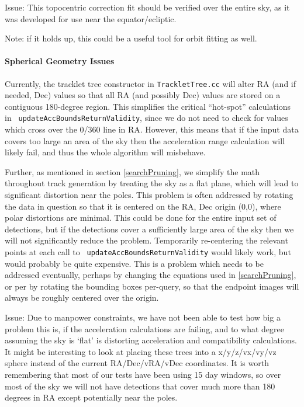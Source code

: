 Issue: This topocentric correction fit should be verified over the entire sky, as it was developed for
use near the equator/ecliptic. 

Note: if it holds up, this could be a useful tool for orbit fitting as well. 


\paragraph{Spherical Geometry Issues}
Currently, the tracklet tree constructor in {\tt TrackletTree.cc} will
alter RA (and if needed, Dec) values so that all RA (and possibly Dec)
values are stored on a contiguous 180-degree region.  This simplifies
the critical ``hot-spot'' calculations in {\tt
  updateAccBoundsReturnValidity}, since we do not need to check for
values which cross over the 0/360 line in RA.  However, this means
that if the input data covers too large an area of the sky then the
acceleration range calculation will likely fail, and thus the whole
algorithm will misbehave.

Further, as mentioned in section \ref{searchPruning}, we simplify the
math throughout track generation by treating the sky as a flat plane,
which will lead to significant distortion near the poles.  This
problem is often addressed by rotating the data in question so that it
is centered on the RA, Dec origin (0,0), where polar distortions are
minimal.  This could be done for the entire input set of detections,
but if the detections cover a sufficiently large area of the sky then
we will not significantly reduce the problem.  Temporarily
re-centering the relevant points at each call to {\tt
  updateAccBoundsReturnValidity} would likely work, but would probably
be quite expensive.  This is a problem which needs to be addressed
eventually, perhaps by changing the equations used in
\ref{searchPruning}, or per by rotating the bounding boxes per-query,
so that the endpoint images will always be roughly centered over the
origin.

Issue: Due to manpower constraints, we have not been able to test how big a problem this is, if
the acceleration calculations are failing, and to what degree assuming
the sky is `flat' is distorting acceleration and compatibility
calculations.  It might be interesting to look at placing these trees
into a x/y/z/vx/vy/vz sphere instead of the current RA/Dec/vRA/vDec
coordinates. It is worth remembering that most of our tests have been
using 15 day windows, so over most of the sky we will not have
detections that cover much more than 180 degrees in RA except
potentially near the poles. 


